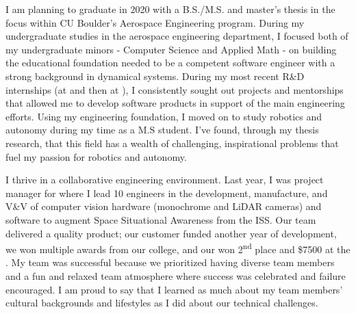 I am planning to graduate in 2020 with a B.S./M.S. and master's thesis in the  focus within CU Boulder's Aerospace Engineering program. During my undergraduate studies in the aerospace engineering department, I focused both of my undergraduate minors - Computer Science and Applied Math - on building the educational foundation needed to be a competent software engineer with a strong background in dynamical systems. During my most recent R\&D internships (at  and then at ), I consistently sought out projects and mentorships that allowed me to develop software products in support of the main engineering efforts. Using my engineering foundation, I moved on to study robotics and autonomy during my time as a M.S student. I’ve found, through my thesis research, that this field has a wealth of challenging, inspirational problems that fuel my passion for robotics and autonomy.

I thrive in a collaborative engineering environment. Last year, I was project manager for  where I lead 10 engineers in the development, manufacture, and V\&V of computer vision hardware (monochrome and LiDAR cameras) and software to augment Space Situational Awareness from the ISS. Our team delivered a quality product; our customer funded another year of development, we won multiple awards from our college, and our
 won 2\textsuperscript{nd} place and \$7500 at the  . My team was successful because we prioritized having diverse team members and a fun and relaxed team atmosphere where success was celebrated and failure encouraged. I am proud to say that I learned as much about my team members' cultural backgrounds and lifestyles as I did about our technical challenges.